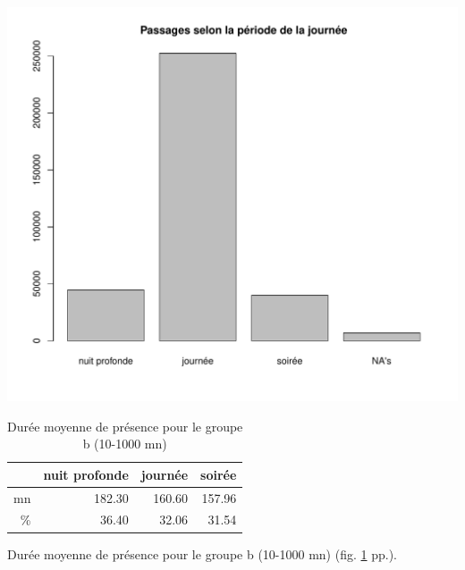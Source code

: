 \documentclass[12pt,english,french,twoside]{book}\usepackage[]{graphicx}\usepackage[]{color}
\makeatletter
\def\maxwidth{ %
  \ifdim\Gin@nat@width>\linewidth
    \linewidth
  \else
    \Gin@nat@width
  \fi
}
\newenvironment{knitrout}{}{} %
\makeatother
\begin{document}
\begin{center}
\begin{knitrout}
\color{fgcolor}
\includegraphics[width=\maxwidth]{figure/periode_1} 

\end{knitrout}

 \label{fig:bp_periode1}
\end{center}

\begin{table}[ht]
\centering
\begin{tabular}{rrrr}
  \hline
 & nuit profonde & journée & soirée \\ 
  \hline
mn & 182.30 & 160.60 & 157.96 \\ 
  \% & 36.40 & 32.06 & 31.54 \\ 
   \hline
\end{tabular}
\caption{Durée moyenne de présence pour le groupe b (10-1000 mn)} 
\label{b_periode}
\end{table}



Durée moyenne de présence pour le groupe b (10-1000 mn) (fig. \ref{b_periode} pp.\pageref{b_periode}).
\end{document}
